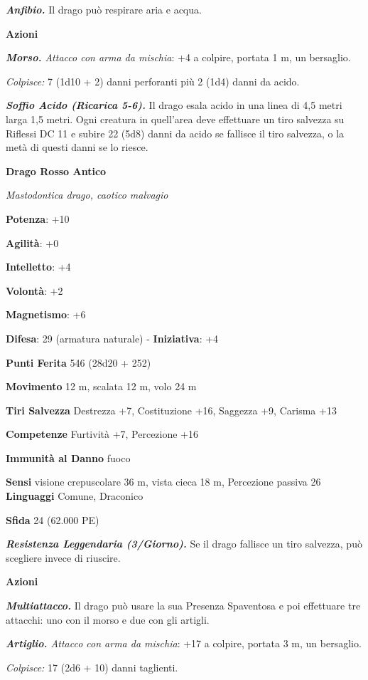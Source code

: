 \begin{multicols}{2}
\emph{\textbf{Anfibio.}} Il drago può respirare aria e acqua.

\smallskip\textbf{Azioni}

\emph{\textbf{Morso.} Attacco con arma da mischia}: +4 a colpire,
portata 1 m, un bersaglio.

\emph{Colpisce:} 7 (1d10 + 2) danni perforanti più 2 (1d4) danni da
acido.

\emph{\textbf{Soffio Acido (Ricarica 5-6).}} Il drago esala acido in una
linea di 4,5 metri larga 1,5 metri. Ogni creatura in quell'area deve
effettuare un tiro salvezza su Riflessi DC 11 e subire 22 (5d8) danni
da acido se fallisce il tiro salvezza, o la metà di questi danni se lo
riesce.

\textbf{Drago Rosso Antico}

\emph{Mastodontica drago, caotico malvagio}

\textbf{Potenza}: +10

\textbf{Agilità}: +0

\textbf{Intelletto}: +4

\textbf{Volontà}: +2

\textbf{Magnetismo}: +6

\textbf{Difesa}: 29 (armatura naturale) - \textbf{Iniziativa}: +4

\textbf{Punti Ferita} 546 (28d20 + 252)

\textbf{Movimento} 12 m, scalata 12 m, volo 24 m

\textbf{Tiri Salvezza} Destrezza +7, Costituzione +16, Saggezza +9,
Carisma +13

\textbf{Competenze} Furtività +7, Percezione +16

\textbf{Immunità al Danno} fuoco

\textbf{Sensi} visione crepuscolare 36 m, vista cieca 18 m, Percezione passiva
26 \textbf{Linguaggi} Comune, Draconico

\textbf{Sfida} 24 (62.000 PE)\smallskip

\emph{\textbf{Resistenza Leggendaria (3/Giorno).}} Se il drago fallisce
un tiro salvezza, può scegliere invece di riuscire.

\smallskip\textbf{Azioni}

\emph{\textbf{Multiattacco.}} Il drago può usare la sua Presenza
Spaventosa e poi effettuare tre attacchi: uno con il morso e due con gli
artigli.

\emph{\textbf{Artiglio.} Attacco con arma da mischia}: +17 a colpire,
portata 3 m, un bersaglio.

\emph{Colpisce:} 17 (2d6 + 10) danni taglienti.


\end{multicols}
